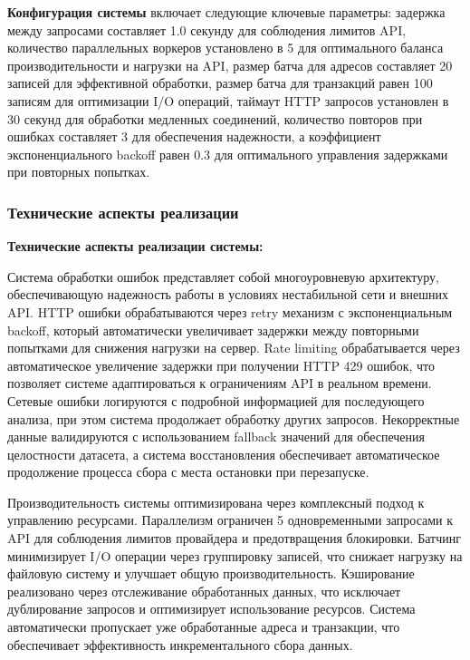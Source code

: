 \textbf{Конфигурация системы} включает следующие ключевые параметры: задержка между запросами составляет 1.0 секунду для соблюдения лимитов API, количество параллельных воркеров установлено в 5 для оптимального баланса производительности и нагрузки на API, размер батча для адресов составляет 20 записей для эффективной обработки, размер батча для транзакций равен 100 записям для оптимизации I/O операций, таймаут HTTP запросов установлен в 30 секунд для обработки медленных соединений, количество повторов при ошибках составляет 3 для обеспечения надежности, а коэффициент экспоненциального backoff равен 0.3 для оптимального управления задержками при повторных попытках.

\subsubsection{Технические аспекты реализации}

\textbf{Технические аспекты реализации системы:}

Система обработки ошибок представляет собой многоуровневую архитектуру, обеспечивающую надежность работы в условиях нестабильной сети и внешних API. HTTP ошибки обрабатываются через retry механизм с экспоненциальным backoff, который автоматически увеличивает задержки между повторными попытками для снижения нагрузки на сервер. Rate limiting обрабатывается через автоматическое увеличение задержки при получении HTTP 429 ошибок, что позволяет системе адаптироваться к ограничениям API в реальном времени. Сетевые ошибки логируются с подробной информацией для последующего анализа, при этом система продолжает обработку других запросов. Некорректные данные валидируются с использованием fallback значений для обеспечения целостности датасета, а система восстановления обеспечивает автоматическое продолжение процесса сбора с места остановки при перезапуске.

Производительность системы оптимизирована через комплексный подход к управлению ресурсами. Параллелизм ограничен 5 одновременными запросами к API для соблюдения лимитов провайдера и предотвращения блокировки. Батчинг минимизирует I/O операции через группировку записей, что снижает нагрузку на файловую систему и улучшает общую производительность. Кэширование реализовано через отслеживание обработанных данных, что исключает дублирование запросов и оптимизирует использование ресурсов. Система автоматически пропускает уже обработанные адреса и транзакции, что обеспечивает эффективность инкрементального сбора данных.

